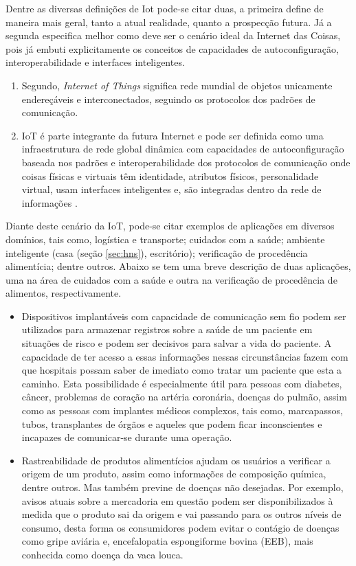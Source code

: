 Dentre as diversas definições de Iot pode-se citar duas, a primeira define de maneira mais geral, tanto a atual realidade, quanto a prospecção futura. Já a segunda especifica melhor como deve ser o cenário ideal da Internet das Coisas, pois já embuti explicitamente os conceitos de capacidades de autoconfiguração, interoperabilidade e interfaces inteligentes.
\begin{enumerate}
\item Segundo\cite{iot2020:2008}, \textit{Internet of Things} significa rede mundial de objetos unicamente endereçáveis e interconectados, seguindo os protocolos dos padrões de comunicação.
\item IoT é parte integrante da futura Internet e pode ser definida como uma infraestrutura de rede global dinâmica com capacidades de autoconfiguração baseada nos padrões e interoperabilidade dos protocolos de comunicação onde coisas físicas e virtuais têm identidade, atributos físicos, personalidade virtual, usam interfaces inteligentes e, são integradas dentro da rede de informações \cite{Sundmaeker:2010}.
\end{enumerate}

Diante deste cenário da IoT, pode-se citar exemplos de aplicações em diversos domínios, tais como, logística e transporte; cuidados com a saúde; ambiente inteligente (casa (seção \ref{sec:hns}), escritório);\cite{Atzori:2010} verificação de procedência alimentícia; dentre outros. Abaixo se tem uma breve descrição de duas aplicações, uma na área de cuidados com a saúde e outra na verificação de procedência de alimentos, respectivamente.

\begin{itemize}
\item Dispositivos implantáveis com capacidade de comunicação sem fio podem ser utilizados para armazenar registros sobre a saúde de um paciente em situações de risco e podem ser decisivos para salvar a vida do paciente. A capacidade de ter acesso a essas informações nessas circunstâncias fazem com que hospitais possam saber de imediato como tratar um paciente que esta a caminho. Esta possibilidade é especialmente útil para pessoas com diabetes, câncer, problemas de coração na artéria coronária, doenças do pulmão, assim como as pessoas com implantes médicos complexos, tais como, marcapassos, tubos, transplantes de órgãos e aqueles que podem ficar inconscientes e incapazes de comunicar-se durante uma operação. \cite{Weber:2010}
\item Rastreabilidade de produtos alimentícios ajudam os usuários a verificar a origem de um produto, assim como informações de composição química, dentre outros. Mas também previne de doenças não desejadas. Por exemplo, avisos atuais sobre a mercadoria em questão podem ser disponibilizados à medida que o produto sai da origem e vai passando para os outros níveis de consumo, desta forma os consumidores podem evitar o contágio de doenças como gripe aviária e, encefalopatia espongiforme bovina (EEB), mais conhecida como doença da vaca louca.\cite{Weber:2010}
\end{itemize}

